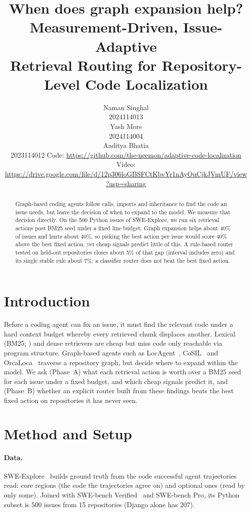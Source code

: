 \documentclass[11pt]{article}
\title{When does graph expansion help? Measurement-Driven, Issue-Adaptive\\
Retrieval Routing for Repository-Level Code Localization}
\author{
  Naman Singhal \\
  2024114013 \\
  \And
  Yash More \\
  2024114004 \\
  \And
  Aaditya Bhatia \\
  2023114012
  \AND
  \normalfont\small Code: \url{https://github.com/the-neemon/adaptive-code-localization} \\
  \normalfont\small Video: \url{https://drive.google.com/file/d/12p306loGBSFCtKbvYr1nAyOuCjkJVmUF/view?usp=sharing}
}
\begin{document}
\maketitle

\begin{abstract}
Graph-based coding agents follow calls, imports and inheritance to find the
code an issue needs, but leave the decision of when to expand to the model.
We measure that decision directly. On the 500 Python issues of SWE-Explore,
we run six retrieval actions post BM25 seed under a fixed line budget.
Graph expansion helps about 40\% of issues and hurts about 40\%, so picking
the best action per issue would score 40\% above the best fixed action, yet
cheap signals predict little of this. A rule-based router tested on held-out
repositories closes about 5\% of that gap (interval includes zero) and its
single stable rule about 7\%; a classifier router does not beat the best
fixed action.
\end{abstract}

\section{Introduction}

Before a coding agent can fix an issue, it must find the relevant code under a
hard context budget whereby every retrieved chunk displaces another. Lexical
(BM25; \citealp{robertson2009bm25}) and dense retrievers are cheap but miss
code only reachable via program structure. Graph-based agents such as
LocAgent~\citep{chen2025locagent}, CoSIL~\citep{jiang2025cosil} and
OrcaLoca~\citep{yu2025orcaloca} traverse a repository graph, but decide
where to expand within the model. We ask (Phase~A) what each retrieval action
is worth over a BM25 seed for each issue under a fixed budget, and which cheap
signals predict it, and (Phase~B) whether an explicit router built from these
findings beats the best fixed action on repositories it has never seen.

\section{Method and Setup}

\paragraph{Data.} SWE-Explore~\citep{zhang2026sweexplore} builds ground truth
from the code successful agent trajectories read: core regions (the code the
trajectories agree on) and optional ones (read by only some). Joined with
SWE-bench Verified~\citep{jimenez2024swebench} and SWE-bench Pro, its Python
subset is 500 issues from 15 repositories (Django alone has 207).
\end{document}

